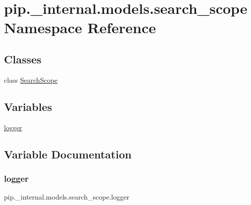\hypertarget{namespacepip_1_1__internal_1_1models_1_1search__scope}{}\section{pip.\+\_\+internal.\+models.\+search\+\_\+scope Namespace Reference}
\label{namespacepip_1_1__internal_1_1models_1_1search__scope}
\subsection*{Classes}
\begin{DoxyCompactItemize}
\item 
class \hyperlink{classpip_1_1__internal_1_1models_1_1search__scope_1_1SearchScope}{Search\+Scope}
\end{DoxyCompactItemize}
\subsection*{Variables}
\begin{DoxyCompactItemize}
\item 
\hyperlink{namespacepip_1_1__internal_1_1models_1_1search__scope_a1256bb4fddfeb6c098dc4f92d959ebb9}{logger}
\end{DoxyCompactItemize}


\subsection{Variable Documentation}
\mbox{\label{namespacepip_1_1__internal_1_1models_1_1search__scope_a1256bb4fddfeb6c098dc4f92d959ebb9}} 
\subsubsection{\texorpdfstring{logger}{logger}}
{\footnotesize\ttfamily pip.\+\_\+internal.\+models.\+search\+\_\+scope.\+logger}

